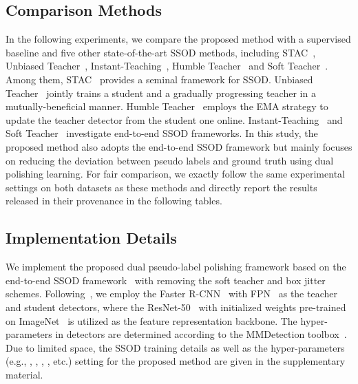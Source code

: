 \documentclass[letterpaper]{article} \usepackage{aaai23}  \usepackage{times}  \usepackage{helvet}  \usepackage{courier}  \usepackage[hyphens]{url}  \usepackage{graphicx} \urlstyle{rm} \def\UrlFont{\rm}  \usepackage{natbib}  \usepackage{caption} \frenchspacing  \setlength{\pdfpagewidth}{8.5in}  \setlength{\pdfpageheight}{11in}  \usepackage{algorithm}
\begin{document}
\subsection{Comparison Methods}
In the following experiments, we compare the proposed method with a supervised baseline and five other state-of-the-art SSOD methods, including STAC~\cite{sohn2020simple}, Unbiased Teacher~\cite{liu2021unbiased}, Instant-Teaching~\cite{zhou2021instant}, Humble Teacher~\cite{tang2021humble} and Soft Teacher~\cite{xu2021end}. Among them, STAC~\cite{sohn2020simple} provides a seminal framework for SSOD. Unbiased Teacher~\cite{liu2021unbiased} jointly trains a student and a gradually progressing teacher in a mutually-beneficial manner. Humble Teacher~\cite{tang2021humble} employs the EMA strategy to update the teacher detector from the student one online. Instant-Teaching~\cite{zhou2021instant} and Soft Teacher~\cite{xu2021end} investigate end-to-end SSOD frameworks. In this study, the proposed method also adopts the end-to-end SSOD framework but mainly focuses on reducing the deviation between pseudo labels and ground truth using dual polishing learning. For fair comparison, we exactly follow the same experimental settings on both datasets as these methods and directly report the results released in their provenance in the following tables.

\subsection{Implementation Details}
We implement the proposed dual pseudo-label polishing framework based on the end-to-end SSOD framework~\cite{xu2021end} with removing the soft teacher and box jitter schemes. Following~\cite{liu2021unbiased,xu2021end}, we employ the Faster R-CNN~\cite{NIPS2015_14bfa6bb} with FPN~\cite{Lin_2017_CVPR} as the teacher and student detectors, where the ResNet-50~\cite{he2016deep} with initialized weights pre-trained on ImageNet~\cite{deng2009imagenet} is utilized as the feature representation backbone. The hyper-parameters in detectors are determined according to the MMDetection toolbox~\cite{chen2019mmdetection}. Due to limited space, the SSOD training details as well as the hyper-parameters (e.g., , , , ,  etc.) setting for the proposed method are given in the supplementary material. 
\end{document}
